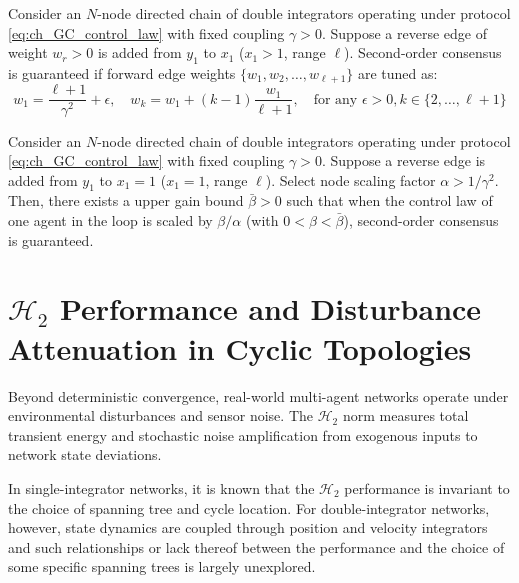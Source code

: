 \documentclass[openright,twoside]{iitbthesis}
\begin{document}
\begin{theo}\label{theo2}
Consider an $N$-node directed chain of double integrators operating under protocol \eqref{eq:ch_GC_control_law} with fixed coupling $\gamma > 0$. Suppose a reverse edge of weight $w_r > 0$ is added from $y_1$ to $x_1$ ($x_1 > 1$, range $\ell$). Second-order consensus is guaranteed if forward edge weights $\{w_1, w_2, \dots, w_{\ell+1}\}$ are tuned as:
\begin{equation}\label{eq:ch_GC_ESScalar_formula}
	w_1 = \frac{\ell+1}{\gamma^2} + \epsilon, \quad w_k = w_1 + (k-1) \frac{w_1}{\ell+1}, \quad \text{for any } \epsilon > 0, k \in \{2, \dots, \ell+1\}
\end{equation}
\end{theo}
\begin{theo}\label{theo3ES}
\leavevmode\par\noindent
Consider an $N$-node directed chain of double integrators operating under protocol \eqref{eq:ch_GC_control_law} with fixed coupling $\gamma > 0$. Suppose a reverse edge is added from $y_1$ to $x_1 = 1$ ($x_1 = 1$, range $\ell$). Select node scaling factor $\alpha > 1/\gamma^2$. Then, there exists a upper gain bound $\bar{\beta} > 0$ such that when the control law of one agent in the loop is scaled by $\beta / \alpha$ (with $0 < \beta < \bar{\beta}$), second-order consensus is guaranteed.
\end{theo}
\section{$\mathcal{H}_2$ Performance and Disturbance Attenuation in Cyclic Topologies}
Beyond deterministic convergence, real-world multi-agent networks operate under environmental disturbances and sensor noise. The $\mathcal{H}_2$ norm measures total transient energy and stochastic noise amplification from exogenous inputs to network state deviations.

In single-integrator networks, it is known that the $\mathcal{H}_2$ performance is invariant to the choice of spanning tree and cycle location. For double-integrator networks, however, state dynamics are coupled through position and velocity integrators and such relationships or lack thereof between the performance and the choice of some specific spanning trees is largely unexplored.
\end{document}
